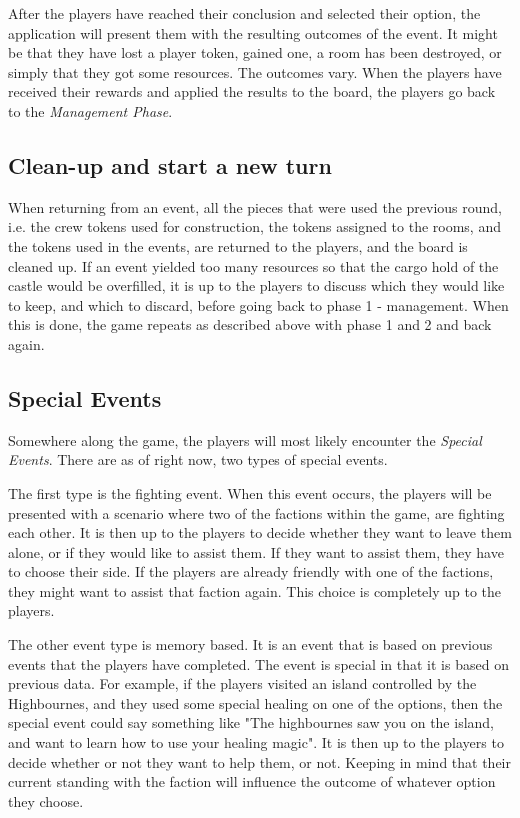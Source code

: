 After the players have reached their conclusion and selected their option, the application will present them with the resulting outcomes of the event. It might be that they have lost a player token, gained one, a room has been destroyed, or simply that they got some resources. The outcomes vary. When the players have received their rewards and applied the results to the board, the players go back to the \textit{Management Phase}.

\subsection{Clean-up and start a new turn}
When returning from an event, all the pieces that were used the previous round, i.e. the crew tokens used for construction, the tokens assigned to the rooms, and the tokens used in the events, are returned to the players, and the board is cleaned up.
If an event yielded too many resources so that the cargo hold of the castle would be overfilled, it is up to the players to discuss which they would like to keep, and which to discard, before going back to phase 1 - management.
When this is done, the game repeats as described above with phase 1 and 2 and back again.

\subsection{Special Events}

Somewhere along the game, the players will most likely encounter the \textit{Special Events}. There are as of right now, two types of special events.

The first type is the fighting event. When this event occurs, the players will be presented with a scenario where two of the factions within the game, are fighting each other. It is then up to the players to decide whether they want to leave them alone, or if they would like to assist them. If they want to assist them, they have to choose their side. If the players are already friendly with one of the factions, they might want to assist that faction again. This choice is completely up to the players.

The other event type is memory based. It is an event that is based on previous events that the players have completed. The event is special in that it is based on previous data. For example, if the players visited an island controlled by the Highbournes, and they used some special healing on one of the options, then the special event could say something like "The highbournes saw you on the island, and want to learn how to use your healing magic". It is then up to the players to decide whether or not they want to help them, or not. Keeping in mind that their current standing with the faction will influence the outcome of whatever option they choose. 

